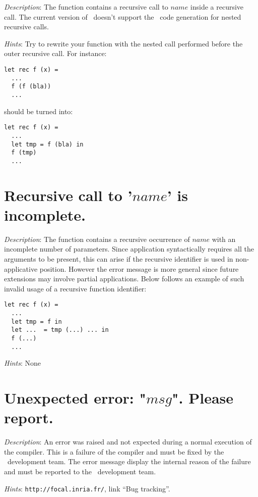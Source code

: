 {\em Description}: The function contains a recursive call to $name$
inside a recursive call. The current version of \focal\ doesn't
support the \coq\ code generation for nested recursive calls.

{\em Hints}: Try to rewrite your function with the nested call
performed before the outer recursive call. For instance:
{\scriptsize
\begin{lstlisting}
let rec f (x) =
  ...
  f (f (bla))
  ...
\end{lstlisting}
}
should be turned into:
{\scriptsize
\begin{lstlisting}
let rec f (x) =
  ...
  let tmp = f (bla) in
  f (tmp)
  ...
\end{lstlisting}
}



\section*{Recursive call to '$name$' is incomplete.}

{\em Description}: The function contains a recursive occurrence of
$name$ with an incomplete number of parameters. Since application
syntactically requires all the arguments to be present, this can arise
if the recursive identifier is used in non-applicative
position. However the error message is more general since future
extensions may involve partial applications. Below follows an example
of such invalid usage of a recursive function identifier:
{\scriptsize
\begin{lstlisting}
let rec f (x) =
  ...
  let tmp = f in
  let ...  = tmp (...) ... in
  f (...)
  ...
\end{lstlisting}
}

{\em Hints}: None



\section*{Unexpected error: "$msg$". Please report.}

{\em Description}: An error was raised and not expected during a
normal execution of the compiler. This is a failure of the compiler
and must be fixed by the \focal\ development team. The error message
display the internal reason of the failure and must be reported to the
\focal\ development team.

{\em Hints}: \verb+http://focal.inria.fr/+, link ``Bug tracking''.
